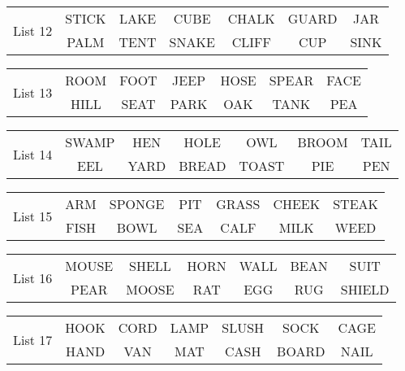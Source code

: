 \documentclass{article}
\begin{document}
\vspace{.1in}
\hspace{.5in}\begin{tabular}{r||c c c c c c }
\multirow{2}{*}{List 12} & STICK & LAKE & CUBE & CHALK & GUARD & JAR\\
\cline{2-7}			& PALM & TENT & SNAKE & CLIFF & CUP & SINK\\
\end{tabular}

\vspace{.1in}
\hspace{.5in}\begin{tabular}{r||c c c c c c }
\multirow{2}{*}{List 13} & ROOM & FOOT & JEEP & HOSE & SPEAR & FACE\\
\cline{2-7}			& HILL & SEAT & PARK & OAK & TANK & PEA\\
\end{tabular}

\vspace{.1in}
\hspace{.5in}\begin{tabular}{r||c c c c c c }
\multirow{2}{*}{List 14} & SWAMP & HEN & HOLE & OWL & BROOM & TAIL\\
\cline{2-7}			& EEL & YARD & BREAD & TOAST & PIE & PEN\\
\end{tabular}

\vspace{.1in}
\hspace{.5in}\begin{tabular}{r||c c c c c c }
\multirow{2}{*}{List 15} & ARM & SPONGE & PIT & GRASS & CHEEK & STEAK\\
\cline{2-7}			& FISH & BOWL & SEA & CALF & MILK & WEED\\
\end{tabular}

\vspace{.1in}
\hspace{.5in}\begin{tabular}{r||c c c c c c }
\multirow{2}{*}{List 16} & MOUSE & SHELL & HORN & WALL & BEAN & SUIT\\
\cline{2-7}			& PEAR & MOOSE & RAT & EGG & RUG & SHIELD\\
\end{tabular}

\vspace{.1in}
\hspace{.5in}\begin{tabular}{r||c c c c c c }
\multirow{2}{*}{List 17} & HOOK & CORD & LAMP & SLUSH & SOCK & CAGE\\
\cline{2-7}			& HAND & VAN & MAT & CASH & BOARD & NAIL\\
\end{tabular}
\end{document}

